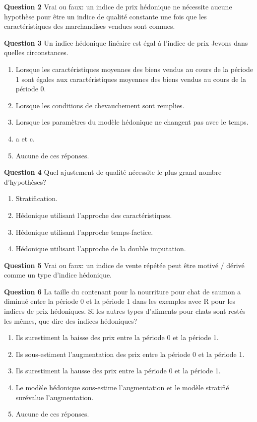 \documentclass[
]{article}
\begin{document}
\textbf{Question 2} Vrai ou faux: un indice de prix hédonique ne nécessite aucune hypothèse pour être un indice de qualité constante une fois que les caractéristiques des marchandises vendues sont connues.

\textbf{Question 3} Un indice hédonique linéaire est égal à l'indice de prix Jevons dans quelles circonstances.

\begin{enumerate}
\def\labelenumi{\alph{enumi})}
\item
  Lorsque les caractéristiques moyennes des biens vendus au cours de la période 1 sont égales aux caractéristiques moyennes des biens vendus au cours de la période 0.
\item
  Lorsque les conditions de chevauchement sont remplies.
\item
  Lorsque les paramètres du modèle hédonique ne changent pas avec le temps.
\item
  a et c.
\item
  Aucune de ces réponses.
\end{enumerate}

\textbf{Question 4} Quel ajustement de qualité nécessite le plus grand nombre d'hypothèses?

\begin{enumerate}
\def\labelenumi{\alph{enumi})}
\item
  Stratification.
\item
  Hédonique utilisant l'approche des caractéristiques.
\item
  Hédonique utilisant l'approche temps-factice.
\item
  Hédonique utilisant l'approche de la double imputation.
\end{enumerate}

\textbf{Question 5} Vrai ou faux: un indice de vente répétée peut être motivé / dérivé comme un type d'indice hédonique.

\textbf{Question 6} La taille du contenant pour la nourriture pour chat de saumon a diminué entre la période 0 et la période 1 dans les exemples avec R pour les indices de prix hédoniques. Si les autres types d'aliments pour chats sont restés les mêmes, que dire des indices hédoniques?

\begin{enumerate}
\def\labelenumi{\alph{enumi})}
\item
  Ils surestiment la baisse des prix entre la période 0 et la période 1.
\item
  Ils sous-estiment l'augmentation des prix entre la période 0 et la période 1.
\item
  Ils surestiment la hausse des prix entre la période 0 et la période 1.
\item
  Le modèle hédonique sous-estime l'augmentation et le modèle stratifié surévalue l'augmentation.
\item
  Aucune de ces réponses.
\end{enumerate}
\end{document}
